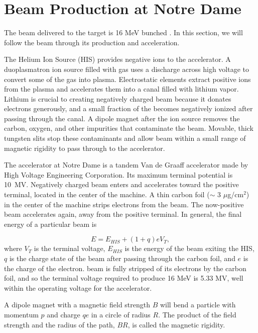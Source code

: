 \section{Beam Production at Notre Dame}
The beam delivered to the target is 16 MeV bunched .  In this section, we will follow the beam through its production and acceleration.

The Helium Ion Source (HIS) provides negative  ions to the accelerator.  A duoplasmatron ion source filled with  gas uses a discharge across high voltage to convert some of the gas into plasma.  Electrostatic elements extract positive  ions from the plasma and accelerates them into a canal filled with lithium vapor.  Lithium is crucial to creating negatively charged beam because it donates electrons generously, and a small fraction of the  becomes negatively ionized after passing through the canal.  A dipole magnet after the ion source removes the carbon, oxygen, and other impurities that contaminate the  beam.  Movable, thick tungsten slits stop these contaminants and allow beam within a small range of magnetic rigidity to pass through to the accelerator.

The accelerator at Notre Dame is a tandem Van de Graaff accelerator made by High Voltage Engineering Corporation.  Its maximum terminal potential is 10~MV.  Negatively charged beam enters and accelerates toward the positive terminal, located in the center of the machine. A thin carbon foil ($\sim$ 3 $\mu$g/cm$^2$) in the center of the machine strips electrons from the beam.  The now-positive beam accelerates again, away from the positive terminal. In general, the final energy of a particular beam is 

\begin{equation}
E = E_{HIS} + (1+q)eV_T,
\end{equation}
where $V_T$ is the terminal voltage, $E_{HIS}$ is the energy of the beam exiting the HIS, $q$ is the charge state of the beam after passing through the carbon foil, and $e$ is the charge of the electron.   beam is fully stripped of its electrons by the carbon foil, and so the terminal voltage required to produce 16 MeV  is 5.33 MV, well within the operating voltage for the accelerator.    

A dipole magnet with a magnetic field strength $B$ will bend a particle with momentum $p$ and charge $qe$ in a circle of radius $R$.  The product of the field strength and the radius of the path, $BR$, is called the magnetic rigidity.

